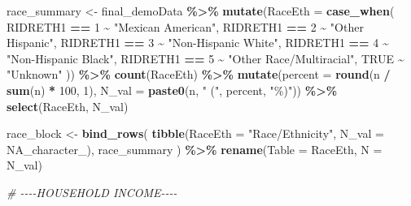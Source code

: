 \documentclass[
]{article}
\newenvironment{Shaded}{\begin{snugshade}}{\end{snugshade}}
\newcommand{\AttributeTok}[1]{\textcolor[rgb]{0.13,0.29,0.53}{#1}}
\newcommand{\CommentTok}[1]{\textcolor[rgb]{0.56,0.35,0.01}{\textit{#1}}}
\newcommand{\ConstantTok}[1]{\textcolor[rgb]{0.56,0.35,0.01}{#1}}
\newcommand{\DecValTok}[1]{\textcolor[rgb]{0.00,0.00,0.81}{#1}}
\newcommand{\FunctionTok}[1]{\textcolor[rgb]{0.13,0.29,0.53}{\textbf{#1}}}
\newcommand{\NormalTok}[1]{#1}
\newcommand{\OtherTok}[1]{\textcolor[rgb]{0.56,0.35,0.01}{#1}}
\newcommand{\SpecialCharTok}[1]{\textcolor[rgb]{0.81,0.36,0.00}{\textbf{#1}}}
\newcommand{\StringTok}[1]{\textcolor[rgb]{0.31,0.60,0.02}{#1}}
\begin{document}
\begin{Shaded}
\begin{Highlighting}[]
\NormalTok{race\_summary }\OtherTok{\textless{}{-}}\NormalTok{ final\_demoData }\SpecialCharTok{\%\textgreater{}\%}
  \FunctionTok{mutate}\NormalTok{(}\AttributeTok{RaceEth =} \FunctionTok{case\_when}\NormalTok{(}
\NormalTok{    RIDRETH1 }\SpecialCharTok{==} \DecValTok{1} \SpecialCharTok{\textasciitilde{}} \StringTok{"Mexican American"}\NormalTok{,}
\NormalTok{    RIDRETH1 }\SpecialCharTok{==} \DecValTok{2} \SpecialCharTok{\textasciitilde{}} \StringTok{"Other Hispanic"}\NormalTok{,}
\NormalTok{    RIDRETH1 }\SpecialCharTok{==} \DecValTok{3} \SpecialCharTok{\textasciitilde{}} \StringTok{"Non{-}Hispanic White"}\NormalTok{,}
\NormalTok{    RIDRETH1 }\SpecialCharTok{==} \DecValTok{4} \SpecialCharTok{\textasciitilde{}} \StringTok{"Non{-}Hispanic Black"}\NormalTok{,}
\NormalTok{    RIDRETH1 }\SpecialCharTok{==} \DecValTok{5} \SpecialCharTok{\textasciitilde{}} \StringTok{"Other Race/Multiracial"}\NormalTok{,}
    \ConstantTok{TRUE}          \SpecialCharTok{\textasciitilde{}} \StringTok{"Unknown"}
\NormalTok{  )) }\SpecialCharTok{\%\textgreater{}\%}
  \FunctionTok{count}\NormalTok{(RaceEth) }\SpecialCharTok{\%\textgreater{}\%}
  \FunctionTok{mutate}\NormalTok{(}\AttributeTok{percent =} \FunctionTok{round}\NormalTok{(n }\SpecialCharTok{/} \FunctionTok{sum}\NormalTok{(n) }\SpecialCharTok{*} \DecValTok{100}\NormalTok{, }\DecValTok{1}\NormalTok{),}
         \AttributeTok{N\_val =} \FunctionTok{paste0}\NormalTok{(n, }\StringTok{" ("}\NormalTok{, percent, }\StringTok{"\%)"}\NormalTok{)) }\SpecialCharTok{\%\textgreater{}\%}
  \FunctionTok{select}\NormalTok{(RaceEth, N\_val)}

\NormalTok{race\_block }\OtherTok{\textless{}{-}} \FunctionTok{bind\_rows}\NormalTok{(}
  \FunctionTok{tibble}\NormalTok{(}\AttributeTok{RaceEth =} \StringTok{"Race/Ethnicity"}\NormalTok{, }\AttributeTok{N\_val =} \ConstantTok{NA\_character\_}\NormalTok{),}
\NormalTok{  race\_summary}
\NormalTok{) }\SpecialCharTok{\%\textgreater{}\%} \FunctionTok{rename}\NormalTok{(}\AttributeTok{Table =}\NormalTok{ RaceEth, }\AttributeTok{N =}\NormalTok{ N\_val)}

\CommentTok{\# {-}{-}{-}{-}HOUSEHOLD INCOME{-}{-}{-}{-}}


\end{Highlighting}
\end{Shaded}
\end{document}
